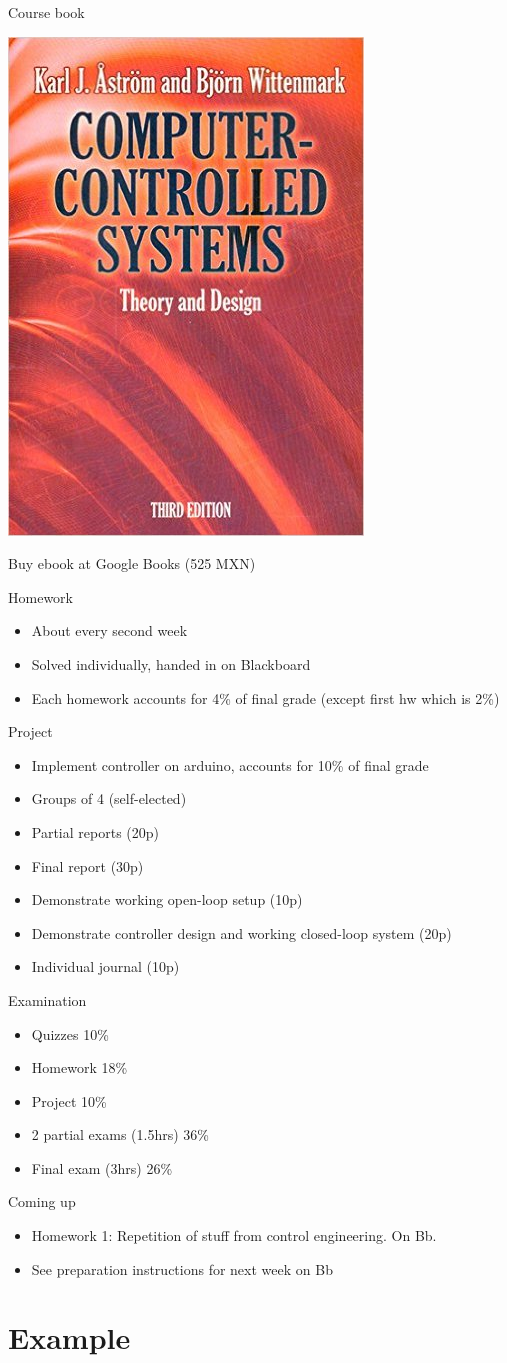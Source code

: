 \documentclass[presentation,aspectratio=169]{beamer}
\begin{document}
\begin{frame}[label=sec-5-2]{Course book}
\begin{center}
\includegraphics[width=0.2\linewidth]{../figures/book.png}
\end{center}
Buy ebook at Google Books (525 MXN)
\end{frame}

\begin{frame}[label=sec-5-3]{Homework}
\begin{itemize}
\item About every second week
\item Solved individually, handed in on Blackboard
\item Each homework accounts for 4\% of final grade (except first hw which is 2\%)
\end{itemize}
\end{frame}

\begin{frame}[label=sec-5-4]{Project}
\begin{itemize}
\item Implement controller on arduino, accounts for 10\% of final grade
\item Groups of 4 (self-elected)
\item Partial reports (20p)
\item Final report (30p)
\item Demonstrate working open-loop setup (10p)
\item Demonstrate controller design and  working closed-loop system (20p)
\item Individual journal (10p)
\end{itemize}
\end{frame}

\begin{frame}[label=sec-5-5]{Examination}
\begin{itemize}
\item Quizzes 10\%
\item Homework 18\%
\item Project 10\%
\item 2 partial exams (1.5hrs) 36\%
\item Final exam (3hrs) 26\%
\end{itemize}
\end{frame}


\begin{frame}[label=sec-5-6]{Coming up}
\begin{itemize}
\item Homework 1: Repetition of stuff from control engineering. On Bb.
\item See preparation instructions for next week on Bb
\end{itemize}
\end{frame}

\section{Example}
\label{sec-6}
\end{document}
